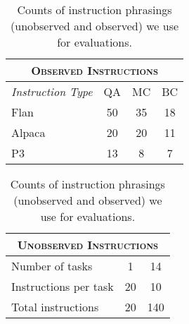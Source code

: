 



\begin{table}%
  \centering
  \small
  \begin{tabular}[t]{l l c c c}
    \multicolumn{5}{c}{\textsc{Observed Instructions}}         \\
    \toprule
    \emph{Instruction Type} & \multicolumn{2}{c}{QA} & MC & BC \\
    Flan                    & \multicolumn{2}{c}{50} & 35 & 18 \\
    Alpaca                  & \multicolumn{2}{c}{20} & 20 & 11 \\
    P3                      & \multicolumn{2}{c}{13} & 8  & 7  \\
  \end{tabular}
  \quad
  \begin{tabular}[t]{l l|c|c|c}
    \multicolumn{5}{c}{\textsc{Unobserved Instructions}}                     \\
    \toprule
    Number of tasks       & \multicolumn{2}{c}{1}  & \multicolumn{2}{c}{14}  \\
    Instructions per task & \multicolumn{2}{c}{20} & \multicolumn{2}{c}{10}  \\
    \hline
    Total instructions    & \multicolumn{2}{c}{20} & \multicolumn{2}{c}{140} \\
  \end{tabular}

  \caption{Counts of instruction phrasings (unobserved and observed) we use for evaluations.}
  \label{tab:data_stat}
\end{table}


